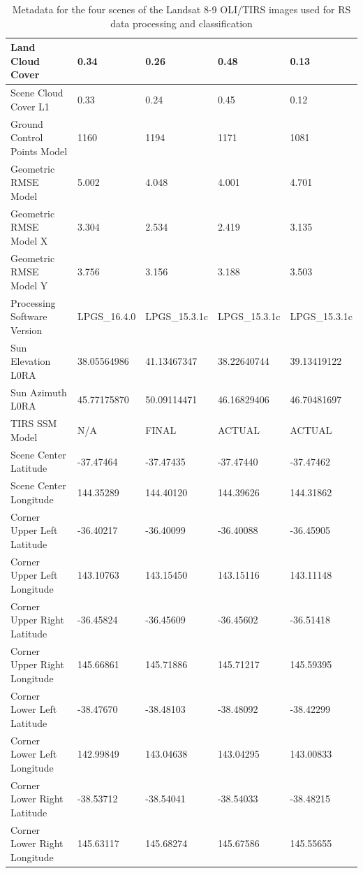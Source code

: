 \documentclass[jmse,article,submit,pdftex,moreauthors]{Definitions/mdpi}
\begin{document}
\begin{table}
{\begin{tabular}{|l|l|l|l|l|}
        Land Cloud Cover & 0.34 & 0.26 & 0.48 & 0.13 \\ \hline
        Scene Cloud Cover L1 & 0.33 & 0.24 & 0.45 & 0.12 \\ \hline
        Ground Control Points Model & 1160 & 1194 & 1171 & 1081 \\ \hline
        Geometric RMSE Model & 5.002 & 4.048 & 4.001 & 4.701 \\ \hline
        Geometric RMSE Model X & 3.304 & 2.534 & 2.419 & 3.135 \\ \hline
        Geometric RMSE Model Y & 3.756 & 3.156 & 3.188 & 3.503 \\ \hline
        Processing Software Version & LPGS\_16.4.0 & LPGS\_15.3.1c & LPGS\_15.3.1c & LPGS\_15.3.1c \\ \hline
        Sun Elevation L0RA & 38.05564986 & 41.13467347 & 38.22640744 & 39.13419122 \\ \hline
        Sun Azimuth L0RA & 45.77175870 & 50.09114471 & 46.16829406 & 46.70481697 \\ \hline
        TIRS SSM Model & N/A & FINAL & ACTUAL & ACTUAL \\ \hline
        Scene Center Latitude & -37.47464 & -37.47435 & -37.47440 & -37.47462 \\ \hline
        Scene Center Longitude & 144.35289 & 144.40120 & 144.39626 & 144.31862 \\ \hline
        Corner Upper Left Latitude & -36.40217 & -36.40099 & -36.40088 & -36.45905 \\ \hline
        Corner Upper Left Longitude & 143.10763 & 143.15450 & 143.15116 & 143.11148 \\ \hline
        Corner Upper Right Latitude & -36.45824 & -36.45609 & -36.45602 & -36.51418 \\ \hline
        Corner Upper Right Longitude & 145.66861 & 145.71886 & 145.71217 & 145.59395 \\ \hline
        Corner Lower Left Latitude & -38.47670 & -38.48103 & -38.48092 & -38.42299 \\ \hline
        Corner Lower Left Longitude & 142.99849 & 143.04638 & 143.04295 & 143.00833 \\ \hline
        Corner Lower Right Latitude & -38.53712 & -38.54041 & -38.54033 & -38.48215 \\ \hline
        Corner Lower Right Longitude & 145.63117 & 145.68274 & 145.67586 & 145.55655 \\ \hline
    \end{tabular}
    }
\caption{Metadata for the four scenes of the Landsat 8-9 OLI/TIRS images used for RS data processing and classification}
\label{tab01}
\end{table}
\end{document}
